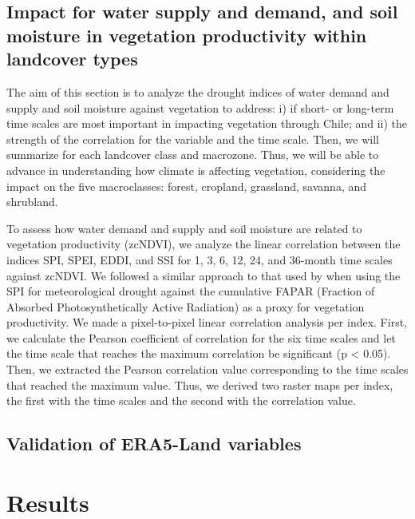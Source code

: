 \documentclass[
  number,
  preprint,
  3p,
  onecolumn]{elsarticle}
\begin{document}
\hypertarget{impact-for-water-supply-and-demand-and-soil-moisture-in-vegetation-productivity-within-landcover-types}{%
\subsection{Impact for water supply and demand, and soil moisture in
vegetation productivity within landcover
types}\label{impact-for-water-supply-and-demand-and-soil-moisture-in-vegetation-productivity-within-landcover-types}}

The aim of this section is to analyze the drought indices of water
demand and supply and soil moisture against vegetation to address: i) if
short- or long-term time scales are most important in impacting
vegetation through Chile; and ii) the strength of the correlation for
the variable and the time scale. Then, we will summarize for each
landcover class and macrozone. Thus, we will be able to advance in
understanding how climate is affecting vegetation, considering the
impact on the five macroclasses: forest, cropland, grassland, savanna,
and shrubland.

To assess how water demand and supply and soil moisture are related to
vegetation productivity (zcNDVI), we analyze the linear correlation
between the indices SPI, SPEI, EDDI, and SSI for 1, 3, 6, 12, 24, and
36-month time scales against zcNDVI. We followed a similar approach to
that used by \citep{Meroni2016} when using the SPI for meteorological
drought against the cumulative FAPAR (Fraction of Absorbed
Photosynthetically Active Radiation) as a proxy for vegetation
productivity. We made a pixel-to-pixel linear correlation analysis per
index. First, we calculate the Pearson coefficient of correlation for
the six time scales and let the time scale that reaches the maximum
correlation be significant (p \textless{} 0.05). Then, we extracted the
Pearson correlation value corresponding to the time scales that reached
the maximum value. Thus, we derived two raster maps per index, the first
with the time scales and the second with the correlation value.

\hypertarget{validation-of-era5-land-variables}{%
\subsection{Validation of ERA5-Land
variables}\label{validation-of-era5-land-variables}}

\hypertarget{results}{%
\section{Results}\label{results}}
\end{document}
